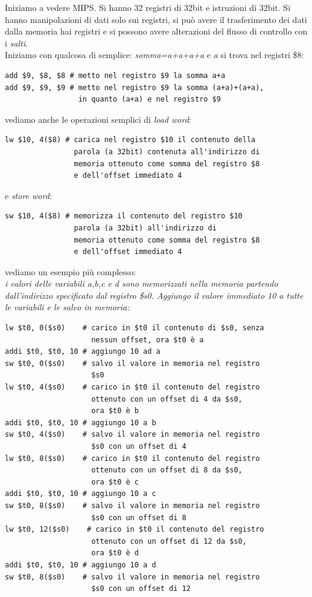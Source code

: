 \documentclass[a4paper,12pt, oneside]{book}
\begin{document}
Iniziamo a vedere MIPS. Si hanno 32 registri di 32bit e istruzioni di 32bit. Si hanno manipolazioni di dati solo sui registri, si può avere il trasferimento dei dati dalla memoria hai registri e si possono avere alterazioni del flusso di controllo con i \textit{salti}.\\
Iniziamo con qualcosa di semplice:
\textit{somma=a+a+a+a} e \textit{a} si trova nel registri \$8:
\begin{verbatim}
add $9, $8, $8 # metto nel registro $9 la somma a+a
add $9, $9, $9 # metto nel registro $9 la somma (a+a)+(a+a),
                 in quanto (a+a) e nel registro $9
\end{verbatim}
\newpage
vediamo anche le operazioni semplici di \textit{load word}:
\begin{verbatim}
lw $10, 4($8) # carica nel registro $10 il contenuto della
                parola (a 32bit) contenuta all'indirizzo di 
                memoria ottenuto come somma del registro $8
                e dell'offset immediato 4
\end{verbatim}
e \textit{store word}:
\begin{verbatim}
sw $10, 4($8) # memorizza il contenuto del registro $10 
                parola (a 32bit) all'indirizzo di 
                memoria ottenuto come somma del registro $8
                e dell'offset immediato 4
\end{verbatim}
vediamo un esempio più complesso:\\
\textit{i valori delle variabili a,b,c e d sono memorizzati nella memoria partendo dall'indirizzo specificato dal registro \$s0. Aggiungo il valore immediato 10 a tutte le variabili e le salvo in memoria: }
\begin{verbatim}
lw $t0, 0($s0)    # carico in $t0 il contenuto di $s0, senza 
                    nessun offset, ora $t0 è a
addi $t0, $t0, 10 # aggiungo 10 ad a
sw $t0, 0($s0)    # salvo il valore in memoria nel registro
                    $s0
lw $t0, 4($s0)    # carico in $t0 il contenuto del registro 
                    ottenuto con un offset di 4 da $s0, 
                    ora $t0 è b
addi $t0, $t0, 10 # aggiungo 10 a b
sw $t0, 4($s0)    # salvo il valore in memoria nel registro
                    $s0 con un offset di 4
lw $t0, 8($s0)    # carico in $t0 il contenuto del registro 
                    ottenuto con un offset di 8 da $s0, 
                    ora $t0 è c
addi $t0, $t0, 10 # aggiungo 10 a c
sw $t0, 8($s0)    # salvo il valore in memoria nel registro
                    $s0 con un offset di 8
lw $t0, 12($s0)    # carico in $t0 il contenuto del registro 
                    ottenuto con un offset di 12 da $s0, 
                    ora $t0 è d
addi $t0, $t0, 10 # aggiungo 10 a d
sw $t0, 8($s0)    # salvo il valore in memoria nel registro
                    $s0 con un offset di 12
 
\end{verbatim}
\end{document}
